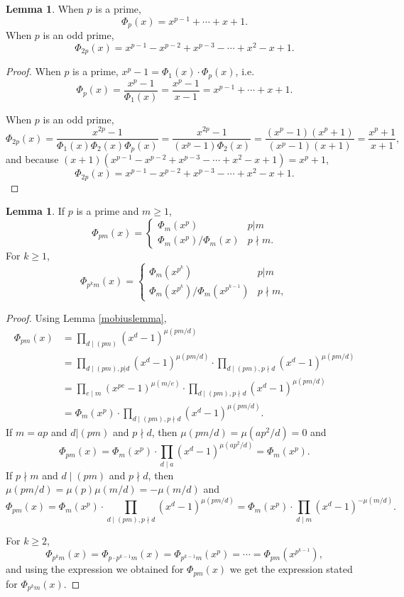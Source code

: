 \documentclass{article}
\theoremstyle{definition}
\newtheorem{lemma}[theorem]{Lemma}
\theoremstyle{definition}
\begin{document}
\begin{lemma}
When $p$ is a prime,
\[
\Phi_p(x)  = x^{p-1}+\cdots+x+1.
\]
When $p$ is an odd prime,
\[
\Phi_{2p}(x)  = x^{p-1}-x^{p-2}+x^{p-3}-\cdots+x^2-x+1.
\]
\end{lemma}
\begin{proof}
When $p$ is a prime, $x^p-1 = \Phi_1(x) \cdot \Phi_p(x)$, i.e. 
\[
\Phi_p(x) =\frac{x^p-1}{\Phi_1(x)}= \frac{x^p-1}{x-1} = x^{p-1}+\cdots+x+1.
\]

When $p$ is an odd prime, 
\[
\Phi_{2p}(x) = \frac{x^{2p}-1}{\Phi_1(x) \Phi_2(x) \Phi_p(x)}
 = \frac{x^{2p}-1}{(x^p-1) \Phi_2(x)}
  = 
\frac{(x^p-1)(x^p+1)}{(x^p-1) (x+1)}
=\frac{x^p+1}{x+1},
\]
and because $(x+1)(x^{p-1}-x^{p-2}+x^{p-3}-\cdots+x^2-x+1) = x^p+1$,
\[
\Phi_{2p}(x) = x^{p-1}-x^{p-2}+x^{p-3}-\cdots+x^2-x+1.
\]
\end{proof}




\begin{lemma}
If $p$ is a prime and $m \geq 1$, 
\[
\Phi_{pm}(x)=
\begin{cases}
\Phi_m(x^p)& p | m\\
\Phi_m(x^p)/\Phi_m(x)&p \nmid m.
\end{cases}
\]
For $k \geq 1$,
\[
\Phi_{p^k m}(x)=
\begin{cases}
\Phi_m(x^{p^k})& p | m\\
\Phi_m(x^{p^k})/\Phi_m(x^{p^{k-1}})&p \nmid m,
\end{cases}
\]
\label{pmPhi}
\end{lemma}
\begin{proof}
Using Lemma \ref{mobiuslemma},
\begin{align*}
\Phi_{pm}(x)&= \prod_{d \mid (pm)} (x^d-1)^{\mu(pm/d)}\\
&= \prod_{d \mid (pm), p|d} (x^d-1)^{\mu(pm/d)} \cdot  \prod_{d \mid (pm), p \nmid d} (x^d-1)^{\mu(pm/d)}\\
&= \prod_{e \mid m} (x^{pe}-1)^{\mu(m/e)} \cdot  \prod_{d \mid (pm), p \nmid d} (x^d-1)^{\mu(pm/d)}\\
&=\Phi_m(x^p) \cdot \prod_{d \mid (pm), p \nmid d} (x^d-1)^{\mu(pm/d)}.
\end{align*}
If $m=ap$ and $d|(pm)$ and $p \nmid d$,  then $\mu(pm/d)=\mu(ap^2/d)=0$ and
\[
\Phi_{pm}(x) = \Phi_m(x^p) \cdot \prod_{d \mid a} (x^d-1)^{\mu(ap^2/d)} = \Phi_m(x^p).
\]
If $p \nmid m$ and $d \mid (pm)$ and $p \nmid d$, then $\mu(pm/d) = \mu(p) \mu(m/d)=-\mu(m/d)$ and
\[
\Phi_{pm}(x) = \Phi_m(x^p) \cdot  \prod_{d \mid (pm), p \nmid d} (x^d-1)^{\mu(pm/d)} = 
\Phi_m(x^p) \cdot \prod_{d \mid m} (x^d-1)^{-\mu(m/d)}.
\]

For $k \geq 2$,
\[
\Phi_{p^k m}(x) = \Phi_{p \cdot p^{k-1}m}(x) = \Phi_{p^{k-1}m}(x^p)
=\cdots = \Phi_{pm}(x^{p^{k-1}}),
\]
and using the expression we obtained for $\Phi_{pm}(x)$ we get
the expression stated for $\Phi_{p^km}(x)$. 
\end{proof}
\end{document}
